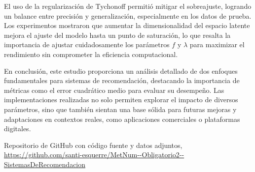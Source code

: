\documentclass[12pt,a4paper]{article}
\begin{document}
El uso de la regularización de Tychonoff permitió mitigar el sobreajuste, logrando un balance entre precisión y generalización, especialmente en los datos de prueba. Los experimentos mostraron que aumentar la dimensionalidad del espacio latente mejora el ajuste del modelo hasta un punto de saturación, lo que resalta la importancia de ajustar cuidadosamente los parámetros \(f\) y \(\lambda\) para maximizar el rendimiento sin comprometer la eficiencia computacional.

En conclusión, este estudio proporciona un análisis detallado de dos enfoques fundamentales para sistemas de recomendación, destacando la importancia de métricas como el error cuadrático medio para evaluar su desempeño. Las implementaciones realizadas no solo permiten explorar el impacto de diversos parámetros, sino que también sientan una base sólida para futuras mejoras y adaptaciones en contextos reales, como aplicaciones comerciales o plataformas digitales.


\begin{thebibliography}{9} %
  
   Repositorio de GitHub con código fuente y datos adjuntos, \url{https://github.com/santi-esquerre/MetNum--Obligatorio2--SistemasDeRecomendacion}
  
\end{thebibliography}
\end{document}
